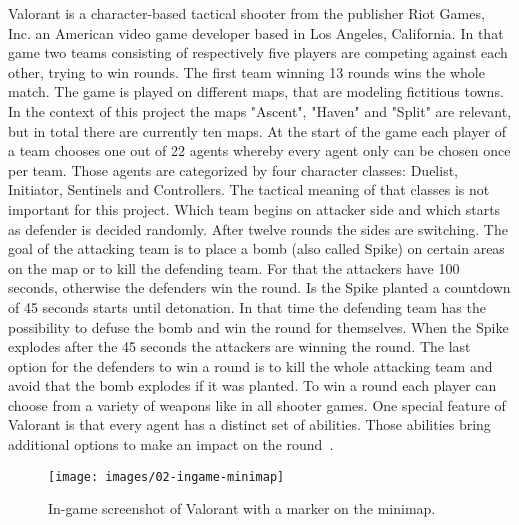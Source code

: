 Valorant is a character-based tactical shooter from the publisher Riot Games, Inc. an American 
video game developer based in Los Angeles, California. In that game two teams consisting of 
respectively five players are competing against each other, trying to win rounds. The first team 
winning 13 rounds wins the whole match. The game is played on different maps, that are modeling
fictitious towns. In the context of this project the maps "Ascent", "Haven" and "Split" are relevant, 
but in total there are currently ten maps. At the start of the game each player of a team chooses one 
out of 22 agents whereby every agent only can be chosen once per team. Those agents are 
categorized by four character classes: Duelist, Initiator, Sentinels and Controllers. The tactical 
meaning of that classes is not important for this project. Which team begins on attacker side and 
which starts as defender is decided randomly. After twelve rounds the sides are switching. The goal 
of the attacking team is to place a bomb (also called Spike) on certain areas on the map or to kill the 
defending team. For that the attackers have 100 seconds, otherwise the defenders win the round. Is 
the Spike planted a countdown of 45 seconds starts until detonation. In that time the defending team 
has the possibility to defuse the bomb and win the round for themselves. When the Spike explodes 
after the 45 seconds the attackers are winning the round. The last option for the defenders to win a 
round is to kill the whole attacking team and avoid that the bomb explodes if it was planted. To win a 
round each player can choose from a variety of weapons like in all shooter games. One special 
feature of Valorant is that every agent has a distinct set of abilities. Those abilities bring additional 
options to make an impact on the round~\cite{riotgames-valorant, spike2023, unrated2023}.

\begin{figure}
	\centering
	\texttt{[image: images/02-ingame-minimap]}
	\caption[In-game screenshot of Valorant]{In-game screenshot of Valorant with a marker on the 
	minimap.}
	\label{fig:intro:ingame}
\end{figure}

